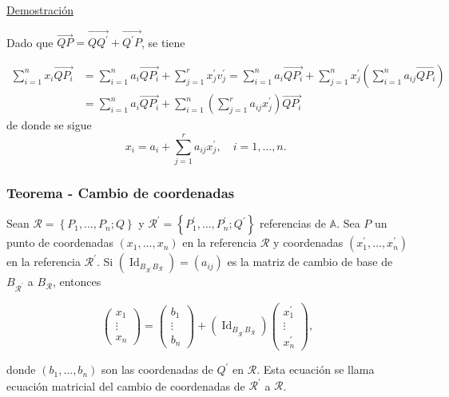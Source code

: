 \documentclass[12pt, a4paper, ones, notitlepage, openany,titlepage]{article}
\newcommand{\demostracion}{\noindent\underline{Demostración}}
\begin{document}
\demostracion

\noindent Dado que $\overrightarrow{Q P}=\overrightarrow{Q Q^{\prime}}+\overrightarrow{Q^{\prime} P}$, se tiene

$$
\begin{aligned}
\sum_{i=1}^{n} x_{i} \overrightarrow{QP_i} & =\sum_{i=1}^{n} a_{i} \overrightarrow{QP_i}+\sum_{j=1}^{r} x_{j}^{\prime} v_{j}^{\prime}=\sum_{i=1}^{n} a_{i} \overrightarrow{QP_i}+\sum_{j=1}^{n} x_{j}^{\prime}\left(\sum_{i=1}^{n} a_{i j} \overrightarrow{QP_i}\right) \\
& =\sum_{i=1}^{n} a_{i} \overrightarrow{QP_i}+\sum_{i=1}^{n}\left(\sum_{j=1}^{r} a_{i j} x_{j}^{\prime}\right) \overrightarrow{QP_i}
\end{aligned}
$$
\noindent de donde se sigue
$$
x_{i}=a_{i}+\sum_{j=1}^{r} a_{i j} x_{j}^{\prime}, \quad i=1, \ldots, n \text {. }
$$

\subsubsection{Teorema - Cambio de coordenadas}
Sean $\mathcal{R}=\left\{P_{1}, \ldots, P_{n} ; Q\right\}$ y $\mathcal{R}^{\prime}=\left\{P_{1}^{\prime}, \ldots, P_{n}^{\prime} ; Q^{\prime}\right\}$ referencias de $\mathbb{A}$. Sea $P$ un punto de coordenadas $\left(x_{1}, \ldots, x_{n}\right)$ en la referencia $\mathcal{R}$ y coordenadas $\left(x_{1}^{\prime}, \ldots, x_{n}^{\prime}\right)$ en la referencia $\mathcal{R}^{\prime}$. Si $\left(\operatorname{Id}_{B_{\mathcal{R}^{\prime}} B_{\mathcal{R}}}\right)=\left(a_{i j}\right)$ es la matriz de cambio de base de $B_{\mathcal{R}^{\prime}}$ a $B_{\mathcal{R}}$, entonces

$$
\left(\begin{array}{c}
x_{1} \\
\vdots \\
x_{n}
\end{array}\right)=\left(\begin{array}{c}
b_{1} \\
\vdots \\
b_{n}
\end{array}\right)+\left(\operatorname{Id}_{B_{\mathcal{R}^{\prime}} B_{\mathcal{R}}}\right)\left(\begin{array}{c}
x_{1}^{\prime} \\
\vdots \\
x_{n}^{\prime}
\end{array}\right),
$$

donde $\left(b_{1}, \ldots, b_{n}\right)$ son las coordenadas de $Q^{\prime}$ en $\mathcal{R}$. Esta ecuación se llama ecuación matricial del cambio de coordenadas de $\mathcal{R}^{\prime}$ a $\mathcal{R}$.
\end{document}
